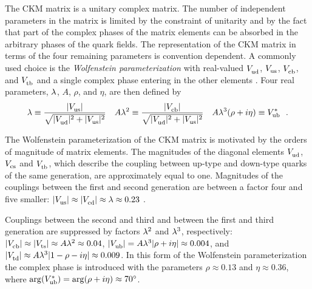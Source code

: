 The CKM matrix is a unitary complex matrix. The number of independent parameters in the matrix is limited by the constraint of unitarity
and by the fact that part of the complex phases of the matrix elements can be absorbed in the arbitrary phases of the quark fields.
The representation of the CKM matrix in terms of the four remaining parameters is convention dependent. A commonly used choice is the
\emph{Wolfenstein parameterization} with real-valued $\Vud$, $\Vus$, $\Vcb$, and $\Vtb$ and a single complex phase entering in the other
elements \cite{Wolfenstein:1983yz,*Chau:1984fp,*Buras:1994ec}. Four real parameters, $\lam$, $A$, $\rho$, and $\eta$, are then
defined by
\begin{equation}
  \begin{gathered}
    \lam \equiv \frac{|\Vus|}{\sqrt{|\Vud|^2 + |\Vus|^2}}
      \quad
      A\lam^2 \equiv \frac{|\Vcb|}{\sqrt{|\Vud|^2 + |\Vus|^2}}
      \quad
      A\lam^3(\rho+i\eta) \equiv \Vub[*]
      \ \ .
  \end{gathered}
\end{equation}

The Wolfenstein parameterization of the CKM matrix is motivated by the orders of magnitude of matrix elements. The magnitudes of the
diagonal elements $\Vud$, $\Vcs$ and $\Vtb$, which describe the coupling between up-type and down-type quarks of the same generation, are
approximately equal to one. Magnitudes of the couplings between the first and second generation are between a factor four and five smaller:
$|\Vus|\approx|\Vcd|\approx\lam\approx0.23$ \cite{Charles:2004jd,Bona:2005vz}.

Couplings between the second and third and between the first and third generation are suppressed by factors $\lam^2$ and $\lam^3$,
respectively: $|\Vcb|\approx|\Vts|\approx A\lam^2\approx0.04$, $|\Vub|=A\lam^3|\rho+i\eta|\approx0.004$, and $|\Vtd|\approx
A\lam^3|1-\rho-i\eta|\approx0.009$. In this form of the Wolfenstein parameterization the complex phase is introduced with the parameters
$\rho\approx0.13$ and $\eta\approx0.36$, where $\arg(\Vub[*])=\arg(\rho+i\eta)\approx70^\circ$.

